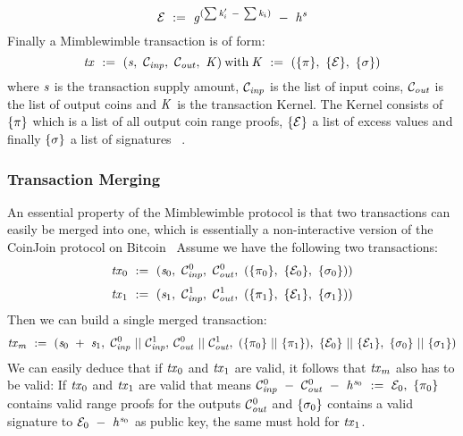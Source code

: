 \[ \mathcal{E} ~:=~ \mathit{g}^{(\sum{\mathit{k}'_i} ~-~ \sum{\mathit{k}_i})} ~-~ \mathit{h}^{\mathit{s}} \]
Finally a Mimblewimble transaction is of form:
\[ \mathit{tx} ~:=~ (\mathit{s} ,~ \mathcal{C}_{\mathit{inp}} ,~ \mathcal{C}_{\mathit{out}} ,~ \mathit{K})\:\text{with}\:\mathit{K} ~:=~ (\{\pi\} ,~ \{\mathcal{E}\} ,~ \{\sigma\}) \]
where $\mathit{s}$ is the transaction supply amount, $\mathcal{C}_{\mathit{inp}}$ is the list of input coins, $\mathcal{C}_{\mathit{out}}$ is the list of output coins and $\mathit{K}$ is the transaction Kernel. The Kernel consists of $\{\pi\}$
which is a list of all output coin range proofs, $\{\mathcal{E}\}$ a list of excess values and finally $\{\sigma\}$ a list of signatures ~\cite{fuchsbauer2019aggregate}. 

\subsubsection{Transaction Merging \label{sec:pre:mimblewimble:merge}}
An essential property of the Mimblewimble protocol is that two transactions can easily be merged into one, which is essentially a non-interactive version of the CoinJoin protocol on Bitcoin~\cite{maxwell2013coinjoin}
Assume we have the following two transactions:
\[ \mathit{tx}_0 ~:=~ (\mathit{s}_0 ,~ \mathcal{C}_{\mathit{inp}}^0 ,~ \mathcal{C}_{\mathit{out}}^0 ,~ (\{\pi_0\} ,~ \{\mathcal{E}_0\} ,~ \{\sigma_0\}) ) \]
\[ \mathit{tx}_1 ~:=~ (\mathit{s}_1 ,~ \mathcal{C}_{\mathit{inp}}^1 ,~ \mathcal{C}_{\mathit{out}}^1 ,~ (\{\pi_1\} ,~ \{\mathcal{E}_1\} ,~ \{\sigma_1\}) ) \]
Then we can build a single merged transaction:
\[ \mathit{tx}_m ~:=~ (\mathit{s}_0 ~+~ \mathit{s}_1 ,~ \mathcal{C}_{\mathit{inp}}^0 ~||~ \mathcal{C}_{\mathit{inp}}^1,\:\mathcal{C}_{\mathit{out}}^0 ~||~ \mathcal{C}_{\mathit{out}}^1 ,~ (\{\pi_0\} ~||~ \{\pi_1\}) ,~
\{\mathcal{E}_0\} ~||~ \{\mathcal{E}_1\} ,~ \{\sigma_0\} ~||~ \{\sigma_1\}) \]
We can easily deduce that if $\mathit{tx}_0$ and $\mathit{tx}_1$ are valid, it follows that $\mathit{tx}_m$ also has to be valid:
If $\mathit{tx}_0$ and $\mathit{tx}_1$ are valid that means $\mathcal{C}_{\mathit{inp}}^0 ~-~ \mathcal{C}_{\mathit{out}}^0 ~-~ \mathit{h}^{\mathit{s}_0} ~:=~ \mathcal{E}_0 ,~ \{\pi_0\}$ contains valid range proofs for the outputs
$\mathcal{C}_{\mathit{out}}^0$ and $\{\sigma_0\}$ contains a valid signature to $\mathcal{E}_0 ~-~ \mathit{h}^{\mathit{s}_0}$ as public key, the same must hold for $\mathit{tx}_1$.


